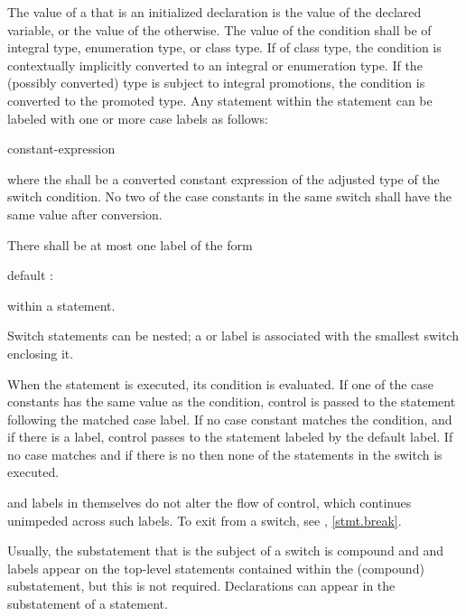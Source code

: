 \pnum
The value of a 
that is an initialized declaration
is the value of the declared variable,
or the value of the  otherwise.
The value of the condition shall be of integral type, enumeration type, or class
type. If of class type, the
condition is contextually implicitly converted to
an integral or enumeration type.
If the (possibly converted) type is subject to integral
promotions, the condition is converted
to the promoted type.
Any
statement within the  statement can be labeled with one or
more case labels as follows:
\begin{ncbnf}
%
 constant-expression \terminal{:}
\end{ncbnf}
where the  shall be
a converted constant expression of the
adjusted type of the switch condition. No two of the case constants in
the same switch shall have the same value after conversion.

\pnum
{}%
There shall be at most one label of the form
\begin{codeblock}
default :
\end{codeblock}
within a  statement.

\pnum
Switch statements can be nested; a  or  label
is associated with the smallest switch enclosing it.

\pnum
When the  statement is executed, its condition is
evaluated.
%
If one of the case constants has the same value as the condition,
control is passed to the statement following the matched case label. If
no case constant matches the condition, and if there is a
%
 label, control passes to the statement labeled by the
default label. If no case matches and if there is no 
then none of the statements in the switch is executed.

\pnum
{} and  labels in themselves do not alter the
flow of control, which continues unimpeded across such labels. To exit
from a switch, see , \ref{stmt.break}.
\begin{note}
Usually, the substatement that is the subject of a switch is compound
and  and  labels appear on the top-level
statements contained within the (compound) substatement, but this is not
required.
%
Declarations can appear in the substatement of a
 statement.
\end{note}

